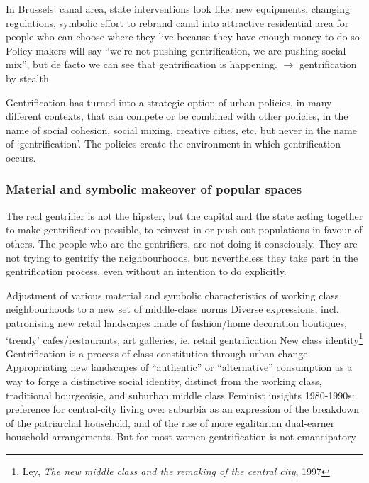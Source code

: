 \documentclass{article}
\begin{document}
In Brussels' canal area, state interventions look like: new equipments, changing regulations, symbolic effort to rebrand canal into attractive residential area for people who can choose where they live because they have enough money to do so
Policy makers will say ``we're not pushing gentrification, we are pushing social mix'', but de facto we can see that gentrification is happening. $\rightarrow$ gentrification by stealth

Gentrification has turned into a strategic option of urban policies, in many different contexts, that can compete or be combined with other policies, in the name of social cohesion, social mixing, creative cities, etc. but never in the name of `gentrification'. The policies create the environment in which gentrification occurs.

\subsubsection{Material and symbolic makeover of popular spaces}

The real gentrifier is not the hipster, but the capital and the state acting together to make gentrification possible, to reinvest in or push out populations in favour of others. The people who are the gentrifiers, are not doing it consciously. They are not trying to gentrify the neighbourhoods, but nevertheless they take part in the gentrification process, even without an intention to do explicitly.

\begin{outline}
	\1 Adjustment of various material and symbolic characteristics of working class neighbourhoods to a new set of middle-class norms
	\1 Diverse expressions, incl. patronising new retail landscapes made of fashion/home decoration boutiques, `trendy' cafes/restaurants, art galleries, ie. retail gentrification
	\1 New class identity\footnote{Ley, \textit{The new middle class and the remaking of the central city}, 1997}
		\2 Gentrification is a process of class constitution through urban change
		\2 Appropriating new landscapes of ``authentic'' or ``alternative'' consumption as a way to forge a distinctive social identity, distinct from the working class, traditional bourgeoisie, and suburban middle class
	\1 Feminist insights 1980-1990s: preference for central-city living over suburbia as an expression of the breakdown of the patriarchal household, and of the rise of more egalitarian dual-earner household arrangements. But for most women gentrification is not emancipatory
\end{outline}
\end{document}
